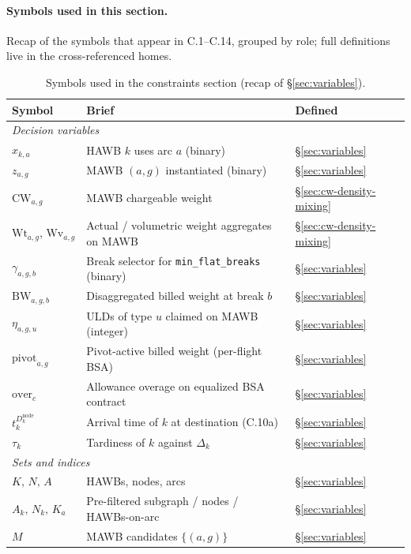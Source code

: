 \documentclass[11pt,a4paper]{article}
\theoremstyle{definition}
\begin{document}
\paragraph{Symbols used in this section.}
Recap of the symbols that appear in C.1--C.14, grouped by role; full
definitions live in the cross-referenced homes.
\begin{table}[H]
\centering
\caption{Symbols used in the constraints section (recap of \S\ref{sec:variables}).}
\label{tab:constraints-syms}
\begin{tabular}{lp{9cm}p{3.5cm}}
\toprule
Symbol & Brief & Defined \\
\midrule
\multicolumn{3}{l}{\textit{Decision variables}} \\
$x_{k,a}$ & HAWB $k$ uses arc $a$ (binary) & \S\ref{sec:variables} \\
$z_{a,g}$ & MAWB $(a, g)$ instantiated (binary) & \S\ref{sec:variables} \\
$\text{CW}_{a,g}$ & MAWB chargeable weight & \S\ref{sec:cw-density-mixing} \\
$\text{Wt}_{a,g},\, \text{Wv}_{a,g}$ & Actual / volumetric weight aggregates on MAWB & \S\ref{sec:cw-density-mixing} \\
$\gamma_{a,g,b}$ & Break selector for \texttt{min\_flat\_breaks} (binary) & \S\ref{sec:variables} \\
$\text{BW}_{a,g,b}$ & Disaggregated billed weight at break $b$ & \S\ref{sec:variables} \\
$\eta_{a,g,u}$ & ULDs of type $u$ claimed on MAWB (integer) & \S\ref{sec:variables} \\
$\text{pivot}_{a,g}$ & Pivot-active billed weight (per-flight BSA) & \S\ref{sec:variables} \\
$\text{over}_c$ & Allowance overage on equalized BSA contract & \S\ref{sec:variables} \\
$t_k^{D_k^{\text{node}}}$ & Arrival time of $k$ at destination (C.10a) & \S\ref{sec:variables} \\
$\tau_k$ & Tardiness of $k$ against $\Delta_k$ & \S\ref{sec:variables} \\
\midrule
\multicolumn{3}{l}{\textit{Sets and indices}} \\
$K,\, N,\, A$ & HAWBs, nodes, arcs & \S\ref{sec:variables} \\
$A_k,\, N_k,\, K_a$ & Pre-filtered subgraph / nodes / HAWBs-on-arc & \S\ref{sec:variables} \\
$M$ & MAWB candidates $\{(a,g)\}$ & \S\ref{sec:variables} \\

\end{tabular}
\end{table}
\end{document}
